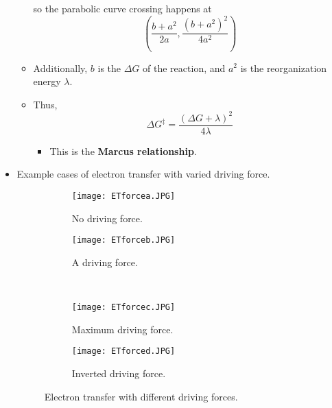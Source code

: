 \documentclass[../notes.tex]{subfiles}
\begin{document}
\begin{itemize}
\begin{itemize}
        so the parabolic curve crossing happens at
        \begin{equation*}
            \left( \frac{b+a^2}{2a},\frac{(b+a^2)^2}{4a^2} \right)
        \end{equation*}
        \item Additionally, $b$ is the $\Delta G$ of the reaction, and $a^2$ is the reorganization energy $\lambda$.
        \item Thus,
        \begin{equation*}
            \Delta G^\ddagger = \frac{(\Delta G+\lambda)^2}{4\lambda}
        \end{equation*}
        \begin{itemize}
            \item This is the \textbf{Marcus relationship}.
        \end{itemize}
    \end{itemize}
    \pagebreak
    \item Example cases of electron transfer with varied driving force.
    \begin{figure}[h!]
        \centering
        \begin{subfigure}[b]{0.3\linewidth}
            \centering
            \texttt{[image: ETforcea.JPG]}
            \caption{No driving force.}
            \label{fig:ETforcea}
        \end{subfigure}
        \begin{subfigure}[b]{0.3\linewidth}
            \centering
            \texttt{[image: ETforceb.JPG]}
            \caption{A driving force.}
            \label{fig:ETforceb}
        \end{subfigure}\\[2em]
        \begin{subfigure}[b]{0.3\linewidth}
            \centering
            \texttt{[image: ETforcec.JPG]}
            \caption{Maximum driving force.}
            \label{fig:ETforcec}
        \end{subfigure}
        \begin{subfigure}[b]{0.3\linewidth}
            \centering
            \texttt{[image: ETforced.JPG]}
            \caption{Inverted driving force.}
            \label{fig:ETforced}
        \end{subfigure}
        \caption{Electron transfer with different driving forces.}
        \label{fig:ETforce}
    \end{figure}

\end{itemize}
\end{document}
